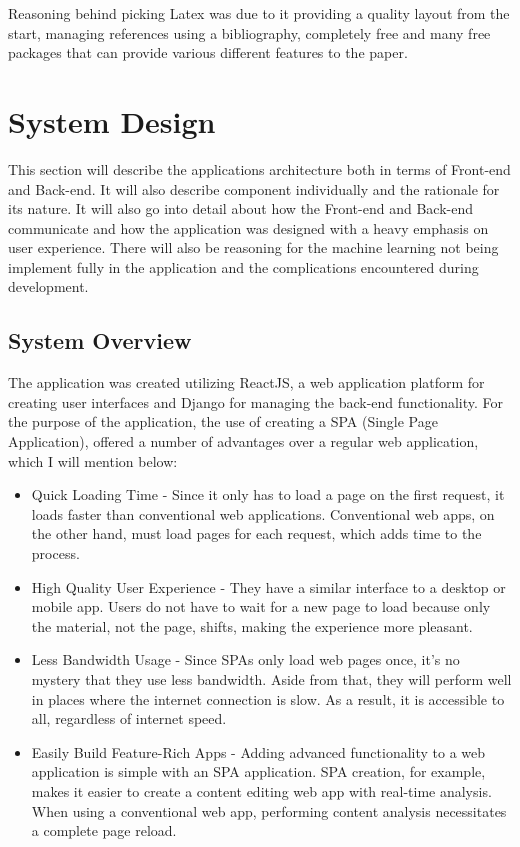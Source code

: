 Reasoning behind picking Latex was due to it providing a quality layout from the start, managing references using a bibliography, completely free and many free packages that can provide various different features to the paper.

\chapter{System Design}
This section will describe the applications architecture both in terms of Front-end and Back-end. It will also describe component individually and the rationale for its nature. It will also go into detail about how the Front-end and Back-end communicate and how the application was designed with a heavy emphasis on user experience. There will also be reasoning for  the machine learning not being implement fully in the application and the complications encountered during development. 

\section{System Overview}
The application was created utilizing ReactJS, a web application platform for creating user interfaces and Django for managing the back-end functionality. For the purpose of the application, the use of creating a SPA (Single Page Application), offered a number of advantages over a regular web application, which I will mention below:

\begin{itemize}
    \item Quick Loading Time - Since it only has to load a page on the first request, it loads faster than conventional web applications. Conventional web apps, on the other hand, must load pages for each request, which adds time to the process.
    \item High Quality User Experience - They have a similar interface to a desktop or mobile app. Users do not have to wait for a new page to load because only the material, not the page, shifts, making the experience more pleasant.
    \item Less Bandwidth Usage - Since SPAs only load web pages once, it's no mystery that they use less bandwidth. Aside from that, they will perform well in places where the internet connection is slow. As a result, it is accessible to all, regardless of internet speed.
    \item Easily Build Feature-Rich Apps - Adding advanced functionality to a web application is simple with an SPA application. SPA creation, for example, makes it easier to create a content editing web app with real-time analysis. When using a conventional web app, performing content analysis necessitates a complete page reload.
\end{itemize}

